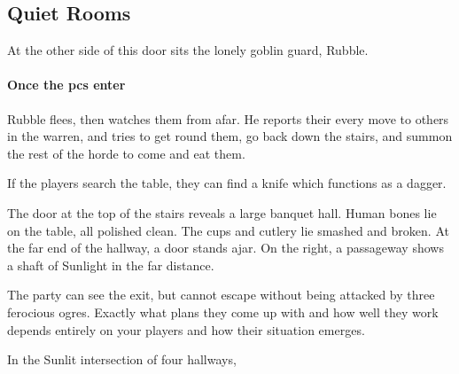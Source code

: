 \begin{multicols}{2}

\subsection{Quiet Rooms}
\label{upper}



At the other side of this door sits the lonely goblin guard, Rubble.

\paragraph{Once the \glspl{pc} enter}
Rubble flees, then watches them from afar.
He reports their every move to others in the \gls{warren}, and tries to get round them, go back down the stairs, and summon the rest of the horde to come and eat them.



If the players search the table,
they can find a knife which functions as a dagger.

\begin{boxtext}
  The door at the top of the stairs reveals a large banquet hall.
  Human bones lie on the table, all polished clean.
  The cups and cutlery lie smashed and broken.
  At the far end of the hallway, a door stands ajar.
  On the right, a passageway shows a shaft of Sunlight in the far distance.
\end{boxtext}


The party can see the exit, but cannot escape without being attacked by three ferocious ogres.
Exactly what plans they come up with and how well they work depends entirely on your players and how their situation emerges.

\begin{boxtext}
  In the Sunlit intersection of four hallways,
  \iftoggle{hardcore}%
    {four ogres sit playing a game of dice.  Two are clad in black leather armour, with a massive sword by their side.
    Another sucks on a horse's uncooked head, while the third goes for a piss behind the staircase.}%
    {three ogres sit playing dice.
    Two are clad in black, leather armour, apparently pieced together from multiple suits.
    The third sits watching them play some dice game.}%
\end{boxtext}


\end{multicols}
